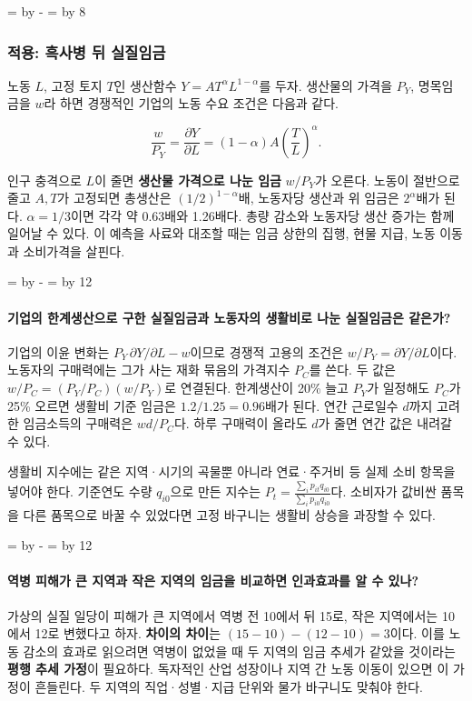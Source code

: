 \documentclass[10pt,a4paper]{article}
\newcommand{\ReserveQuestionSpace}{%
  \par\begingroup
  \dimen0=\pagegoal \advance\dimen0 by -\pagetotal
  \dimen2=\baselineskip \multiply\dimen2 by 12
  \ifdim\dimen0<\dimen2 \newpage\fi
  \endgroup}
\newcommand{\ReserveReadingSectionSpace}{%
  \par\begingroup
  \dimen0=\pagegoal \advance\dimen0 by -\pagetotal
  \dimen2=\baselineskip \multiply\dimen2 by 8
  \ifdim\dimen0<\dimen2 \newpage\fi
  \endgroup}
\begin{document}
\ReserveReadingSectionSpace
\subsubsection*{적용: 흑사병 뒤 실질임금}

노동 $L$, 고정 토지 $T$인 생산함수 $Y=A T^\alpha L^{1-\alpha}$를 두자. 생산물의 가격을 $P_Y$, 명목임금을 $w$라 하면 경쟁적인 기업의 노동 수요 조건은 다음과 같다.\par

\[
\frac{w}{P_Y}=\frac{\partial Y}{\partial L}=(1-\alpha)A\left(\frac{T}{L}\right)^\alpha.
\]

인구 충격으로 $L$이 줄면 \textbf{생산물 가격으로 나눈 임금} $w/P_Y$가 오른다. 노동이 절반으로 줄고 $A,T$가 고정되면 총생산은 $(1/2)^{1-\alpha}$배, 노동자당 생산과 위 임금은 $2^\alpha$배가 된다. $\alpha=1/3$이면 각각 약 0.63배와 1.26배다. 총량 감소와 노동자당 생산 증가는 함께 일어날 수 있다. 이 예측을 사료와 대조할 때는 임금 상한의 집행, 현물 지급, 노동 이동과 소비가격을 살핀다.\par

\ReserveQuestionSpace
\paragraph{기업의 한계생산으로 구한 실질임금과 노동자의 생활비로 나눈 실질임금은 같은가?}
기업의 이윤 변화는 $P_Y\,\partial Y/\partial L-w$이므로 경쟁적 고용의 조건은 $w/P_Y=\partial Y/\partial L$이다. 노동자의 구매력에는 그가 사는 재화 묶음의 가격지수 $P_C$를 쓴다. 두 값은 $w/P_C=(P_Y/P_C)(w/P_Y)$로 연결된다. 한계생산이 20\% 늘고 $P_Y$가 일정해도 $P_C$가 25\% 오르면 생활비 기준 임금은 $1.2/1.25=0.96$배가 된다. 연간 근로일수 $d$까지 고려한 임금소득의 구매력은 $wd/P_C$다. 하루 구매력이 올라도 $d$가 줄면 연간 값은 내려갈 수 있다.\par

생활비 지수에는 같은 지역·시기의 곡물뿐 아니라 연료·주거비 등 실제 소비 항목을 넣어야 한다. 기준연도 수량 $q_{i0}$으로 만든 지수는 $P_t=\frac{\sum_i p_{it}q_{i0}}{\sum_i p_{i0}q_{i0}}$다. 소비자가 값비싼 품목을 다른 품목으로 바꿀 수 있었다면 고정 바구니는 생활비 상승을 과장할 수 있다.\par

\ReserveQuestionSpace
\paragraph{역병 피해가 큰 지역과 작은 지역의 임금을 비교하면 인과효과를 알 수 있나?}
가상의 실질 일당이 피해가 큰 지역에서 역병 전 10에서 뒤 15로, 작은 지역에서는 10에서 12로 변했다고 하자. \textbf{차이의 차이}는 $(15-10)-(12-10)=3$이다. 이를 노동 감소의 효과로 읽으려면 역병이 없었을 때 두 지역의 임금 추세가 같았을 것이라는 \textbf{평행 추세 가정}이 필요하다. 독자적인 산업 성장이나 지역 간 노동 이동이 있으면 이 가정이 흔들린다. 두 지역의 직업·성별·지급 단위와 물가 바구니도 맞춰야 한다.\par
\end{document}
